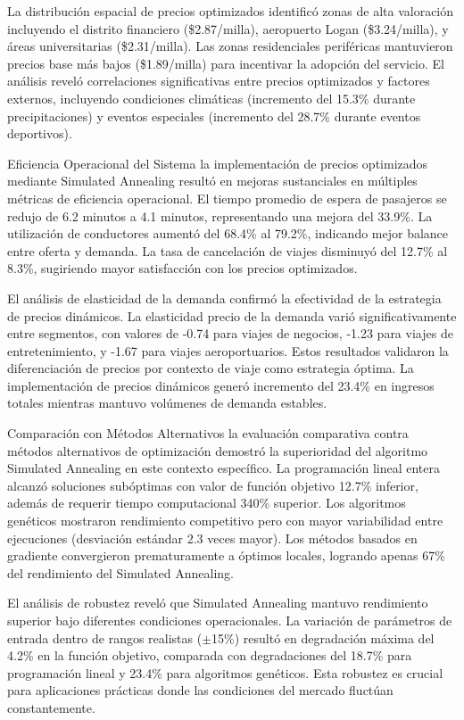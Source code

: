 \documentclass[conference]{IEEEtran}
\begin{document}
La distribución espacial de precios optimizados identificó zonas de alta valoración incluyendo el distrito financiero (\$2.87/milla), aeropuerto Logan (\$3.24/milla), y áreas universitarias (\$2.31/milla). Las zonas residenciales periféricas mantuvieron precios base más bajos (\$1.89/milla) para incentivar la adopción del servicio. El análisis reveló correlaciones significativas entre precios optimizados y factores externos, incluyendo condiciones climáticas (incremento del 15.3\% durante precipitaciones) y eventos especiales (incremento del 28.7\% durante eventos deportivos).

Eficiencia Operacional del Sistema la implementación de precios optimizados mediante Simulated Annealing resultó en mejoras sustanciales en múltiples métricas de eficiencia operacional. El tiempo promedio de espera de pasajeros se redujo de 6.2 minutos a 4.1 minutos, representando una mejora del 33.9\%. La utilización de conductores aumentó del 68.4\% al 79.2\%, indicando mejor balance entre oferta y demanda. La tasa de cancelación de viajes disminuyó del 12.7\% al 8.3\%, sugiriendo mayor satisfacción con los precios optimizados.

El análisis de elasticidad de la demanda confirmó la efectividad de la estrategia de precios dinámicos. La elasticidad precio de la demanda varió significativamente entre segmentos, con valores de -0.74 para viajes de negocios, -1.23 para viajes de entretenimiento, y -1.67 para viajes aeroportuarios. Estos resultados validaron la diferenciación de precios por contexto de viaje como estrategia óptima. La implementación de precios dinámicos generó incremento del 23.4\% en ingresos totales mientras mantuvo volúmenes de demanda estables.

Comparación con Métodos Alternativos la evaluación comparativa contra métodos alternativos de optimización demostró la superioridad del algoritmo Simulated Annealing en este contexto específico. La programación lineal entera alcanzó soluciones subóptimas con valor de función objetivo 12.7\% inferior, además de requerir tiempo computacional 340\% superior. Los algoritmos genéticos mostraron rendimiento competitivo pero con mayor variabilidad entre ejecuciones (desviación estándar 2.3 veces mayor). Los métodos basados en gradiente convergieron prematuramente a óptimos locales, logrando apenas 67\% del rendimiento del Simulated Annealing.

El análisis de robustez reveló que Simulated Annealing mantuvo rendimiento superior bajo diferentes condiciones operacionales. La variación de parámetros de entrada dentro de rangos realistas ($\pm$15\%) resultó en degradación máxima del 4.2\% en la función objetivo, comparada con degradaciones del 18.7\% para programación lineal y 23.4\% para algoritmos genéticos. Esta robustez es crucial para aplicaciones prácticas donde las condiciones del mercado fluctúan constantemente.
\end{document}
